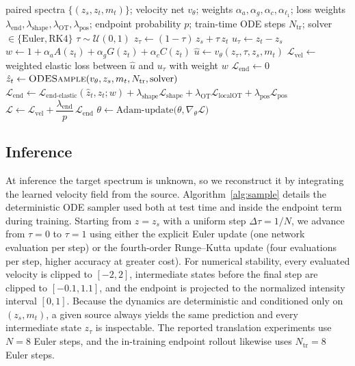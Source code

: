 \documentclass[pdflatex,sn-mathphys-num]{sn-jnl}%
\newcommand{\mname}{SpectraFlow}
\theoremstyle{thmstyleone}%
\theoremstyle{thmstyletwo}%
\theoremstyle{thmstylethree}%
\begin{document}
\begin{appendices}
\begin{algorithm}[!htb]
\small
\caption{\mname\ training (one epoch)}\label{alg:train}
\begin{algorithmic}[1]
\Require paired spectra $\{(z_s,z_t,m_t)\}$; velocity net $v_\theta$; weights $\alpha_a,\alpha_g,\alpha_c,\alpha_{\ell_1}$; loss weights $\lambda_{\mathrm{end}},\lambda_{\mathrm{shape}},\lambda_{\mathrm{OT}},\lambda_{\mathrm{pos}}$; endpoint probability $p$; train-time ODE steps $N_{\mathrm{tr}}$; solver $\in\{\text{Euler},\text{RK4}\}$
  \State $\tau \sim \mathcal{U}(0,1)$ 
  \State $z_\tau \gets (1-\tau)\,z_s + \tau\,z_t$ 
  \State $u_\tau \gets z_t - z_s$ 
  \State $w \gets 1+\alpha_a A(z_t)+\alpha_g G(z_t)+\alpha_c C(z_t)$ 
  \State $\hat u \gets v_\theta(z_\tau,\tau,z_s,m_t)$
  \State $\mathcal{L}_{\mathrm{vel}} \gets$ weighted elastic loss between $\hat u$ and $u_\tau$ with weight $w$
  \State $\mathcal{L}_{\mathrm{end}} \gets 0$
     \State $\hat z_t \gets \Call{ODESample}{v_\theta,z_s,m_t,N_{\mathrm{tr}},\text{solver}}$
     \State $\mathcal{L}_{\mathrm{end}} \gets \mathcal{L}_{\mathrm{end\text{-}elastic}}(\hat z_t,z_t;w) + \lambda_{\mathrm{shape}}\mathcal{L}_{\mathrm{shape}} + \lambda_{\mathrm{OT}}\mathcal{L}_{\mathrm{localOT}} + \lambda_{\mathrm{pos}}\mathcal{L}_{\mathrm{pos}}$
  \EndIf
  \State $\mathcal{L} \gets \mathcal{L}_{\mathrm{vel}} + \dfrac{\lambda_{\mathrm{end}}}{p}\,\mathcal{L}_{\mathrm{end}}$
  \State $\theta \gets \mathrm{Adam\text{-}update}\big(\theta,\nabla_\theta\mathcal{L}\big)$ 
\EndFor
\end{algorithmic}
\end{algorithm}

\subsection{Inference}
At inference the target spectrum is unknown, so we reconstruct it by integrating the learned velocity field from the source. Algorithm~\ref{alg:sample} details the deterministic ODE sampler used both at test time and inside the endpoint term during training. Starting from $z{=}z_s$ with a uniform step $\Delta\tau=1/N$, we advance from $\tau{=}0$ to $\tau{=}1$ using either the explicit Euler update (one network evaluation per step) or the fourth-order Runge--Kutta update (four evaluations per step, higher accuracy at greater cost). For numerical stability, every evaluated velocity is clipped to $[-2,2]$, intermediate states before the final step are clipped to $[-0.1,1.1]$, and the endpoint is projected to the normalized intensity interval $[0,1]$. Because the dynamics are deterministic and conditioned only on $(z_s,m_t)$, a given source always yields the same prediction and every intermediate state $z_\tau$ is inspectable. The reported translation experiments use $N{=}8$ Euler steps, and the in-training endpoint rollout likewise uses $N_{\mathrm{tr}}{=}8$ Euler steps.


\end{appendices}
\end{document}
